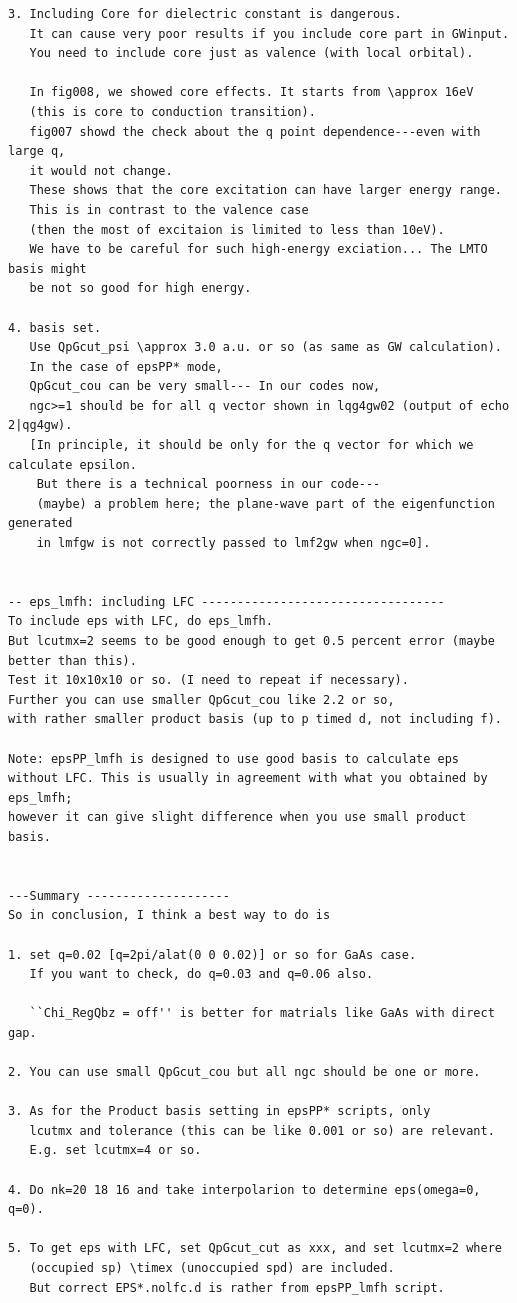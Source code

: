 \begin{verbatim}
3. Including Core for dielectric constant is dangerous. 
   It can cause very poor results if you include core part in GWinput.
   You need to include core just as valence (with local orbital).

   In fig008, we showed core effects. It starts from \approx 16eV 
   (this is core to conduction transition).
   fig007 showd the check about the q point dependence---even with large q,
   it would not change.
   These shows that the core excitation can have larger energy range.
   This is in contrast to the valence case 
   (then the most of excitaion is limited to less than 10eV).
   We have to be careful for such high-energy exciation... The LMTO basis might
   be not so good for high energy.

4. basis set.
   Use QpGcut_psi \approx 3.0 a.u. or so (as same as GW calculation).
   In the case of epsPP* mode, 
   QpGcut_cou can be very small--- In our codes now, 
   ngc>=1 should be for all q vector shown in lqg4gw02 (output of echo 2|qg4gw).
   [In principle, it should be only for the q vector for which we calculate epsilon.
    But there is a technical poorness in our code---
    (maybe) a problem here; the plane-wave part of the eigenfunction generated 
    in lmfgw is not correctly passed to lmf2gw when ngc=0].


-- eps_lmfh: including LFC ----------------------------------
To include eps with LFC, do eps_lmfh. 
But lcutmx=2 seems to be good enough to get 0.5 percent error (maybe better than this).
Test it 10x10x10 or so. (I need to repeat if necessary).
Further you can use smaller QpGcut_cou like 2.2 or so, 
with rather smaller product basis (up to p timed d, not including f).

Note: epsPP_lmfh is designed to use good basis to calculate eps 
without LFC. This is usually in agreement with what you obtained by eps_lmfh;
however it can give slight difference when you use small product basis.


---Summary --------------------
So in conclusion, I think a best way to do is

1. set q=0.02 [q=2pi/alat(0 0 0.02)] or so for GaAs case.
   If you want to check, do q=0.03 and q=0.06 also.

   ``Chi_RegQbz = off'' is better for matrials like GaAs with direct gap.

2. You can use small QpGcut_cou but all ngc should be one or more.

3. As for the Product basis setting in epsPP* scripts, only
   lcutmx and tolerance (this can be like 0.001 or so) are relevant.
   E.g. set lcutmx=4 or so.

4. Do nk=20 18 16 and take interpolarion to determine eps(omega=0, q=0).

5. To get eps with LFC, set QpGcut_cut as xxx, and set lcutmx=2 where
   (occupied sp) \timex (unoccupied spd) are included.
   But correct EPS*.nolfc.d is rather from epsPP_lmfh script.

\end{verbatim}


